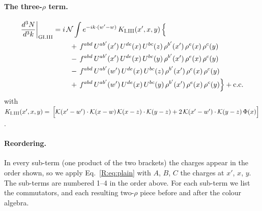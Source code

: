 \documentclass[10pt]{article}
\numberwithin{equation}{section}
\newcommand{\KK}{\mathcal K}
\newcommand{\NN}{\mathcal N}
\begin{document}
\paragraph{The three-$\rho$ term.}
\begin{align}
\frac{d^3N}{d^3k}\bigg|_{\rm GI.III}={}&i\,\NN\int e^{-ik\cdot(w'-w)}\,K_{\rm I.III}(x',x,y)\,\Big\{\notag\\
&\quad +\,f^{abd}\,U^{ab'}(x')\,U^{de}(x)\,U^{bc}(z)\,\rho^{b'}(x')\,\rho^{e}(x)\,\rho^{c}(y)\notag\\
&\quad -\,f^{abd}\,U^{ab'}(x')\,U^{de}(x)\,U^{bc}(y)\,\rho^{b'}(x')\,\rho^{e}(x)\,\rho^{c}(y)\notag\\
&\quad -\,f^{abd}\,U^{ab'}(w')\,U^{de}(x)\,U^{bc}(z)\,\rho^{b'}(x')\,\rho^{e}(x)\,\rho^{c}(y)\notag\\
&\quad +\,f^{abd}\,U^{ab'}(w')\,U^{de}(x)\,U^{bc}(y)\,\rho^{b'}(x')\,\rho^{e}(x)\,\rho^{c}(y)\Big\}+{\rm c.c.}\label{R:eq:in-GI.III}
\end{align}
with $K_{\rm I.III}(x',x,y)=\,\Big[\KK(x'-w')\cdot\KK(x-w)\,\KK(x-z)\cdot\KK(y-z)+2\,\KK(x'-w')\cdot\KK(y-z)\,\Phi(x)\Big]$.
\paragraph{Reordering.} In every sub-term (one product of the two brackets) the charges appear in the order shown, so we apply Eq.~\eqref{R:eq:plain} with $A$, $B$, $C$ the charges at $x'$, $x$, $y$. The sub-terms are numbered 1--4 in the order above. For each sub-term we list the commutators, and each resulting two-$\rho$ piece before and after the colour algebra.
\end{document}
